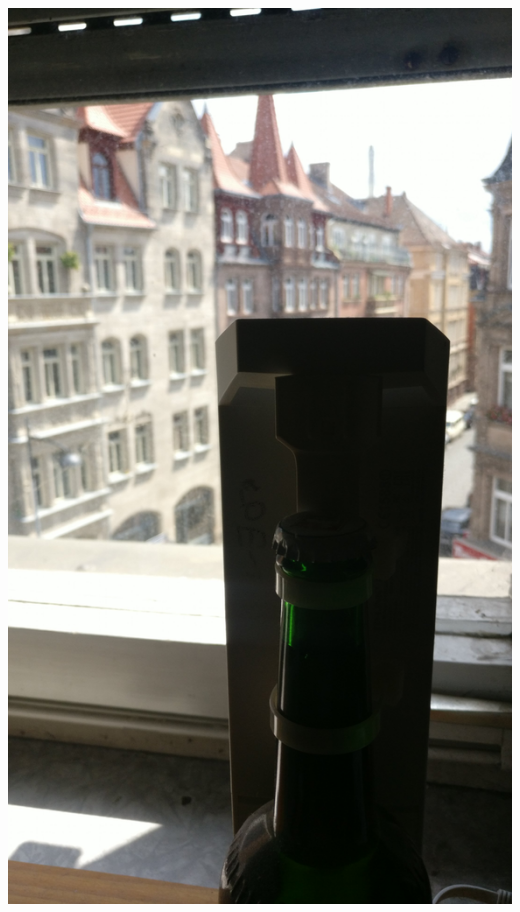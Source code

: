 \documentclass{beamer}
\begin{document}
	\begin{frame}
		\includegraphics[height=0.75\framewidth]{media/p2p-flasche2.jpg}
	\end{frame}
\end{document}
